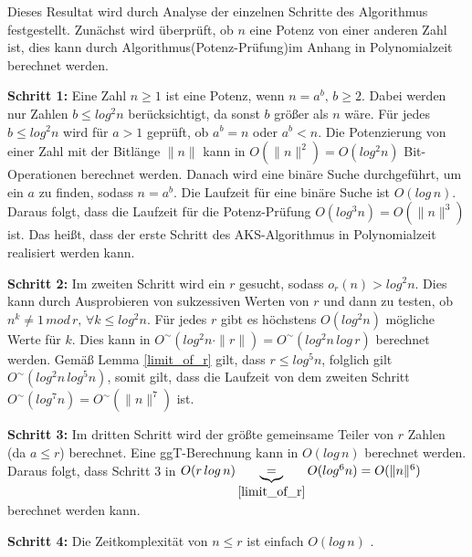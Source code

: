 \documentclass[12pt,oneside]{article}
\theoremstyle{remark}
\theoremstyle{definition}
\begin{document}
Dieses Resultat wird durch Analyse der einzelnen Schritte des Algorithmus festgestellt. Zunächst wird überprüft, ob $n$ eine Potenz von einer anderen Zahl ist, dies kann durch Algorithmus(Potenz-Prüfung)im Anhang in Polynomialzeit berechnet werden.

\textbf{Schritt 1:}\newline
Eine Zahl $n \geq 1$ ist eine Potenz, wenn $ n  = a^b, \, b \geq 2$. Dabei werden nur Zahlen $b \leq log^2 n$ berücksichtigt, da sonst $b$ größer als $n$ wäre. Für jedes $b \leq log^2 n$ wird für $a > 1$ geprüft, ob $a^b = n$ oder $a^b < n$. Die Potenzierung von einer Zahl mit der Bitlänge $\lVert n \lVert$ kann in $O(\lVert n \rVert^2) = O(log^2 n)$ Bit-Operationen berechnet werden.%
Danach wird eine binäre Suche durchgeführt, um ein $a$ zu finden, sodass $ n = a^b$. Die Laufzeit für eine binäre Suche ist $O(log \, n)$. Daraus folgt, dass die Laufzeit für die Potenz-Prüfung $O(log^3 n) = O(\lVert n \rVert^3)$ ist. Das heißt, dass der erste Schritt des AKS-Algorithmus in Polynomialzeit realisiert werden kann.\newline 


\textbf{Schritt 2:}\newline
Im zweiten Schritt wird ein $r$ gesucht, sodass $o_{r}(n) > log^2 n$. Dies kann durch Ausprobieren von sukzessiven Werten von $r$ und dann zu testen, ob $n^k \neq 1 \,  mod \, r, \, \forall k \leq log^2 n$. Für jedes $r$ gibt es höchstens $O(log^2 n)$ mögliche Werte für $k$. Dies kann in $O^{\sim}(log^2 n \cdot \rVert r \lVert) = O^{\sim}(log^2 n \, log \, r)$ berechnet werden.\newline\newline
Gemäß Lemma \ref{limit_of_r} gilt, dass $ r \leq log^5 n$, folglich gilt $O^{\sim}(log^2 n \, log^5 n)$, somit gilt, dass die Laufzeit von dem zweiten Schritt $O^{\sim}(log^7 n) = O^{\sim}(\lVert n \rVert^7)$ ist. 


\textbf{Schritt 3:}\newline
Im dritten Schritt wird der größte gemeinsame Teiler von $r$ Zahlen (da $a \leq r$) berechnet. Eine ggT-Berechnung kann in $O(log \,n)$ berechnet werden\cite{D73}. Daraus folgt, dass Schritt 3 in $O(r \, log \, n) \underbrace{=}_{\ref{limit_of_r}} O(log^6 n) = O(\lVert n \rVert^6)$ berechnet werden kann. 

\textbf{Schritt 4:}\newline
Die Zeitkomplexität von $n \leq r$ ist einfach $O(log \, n)$ \cite{D73}.
\end{document}
